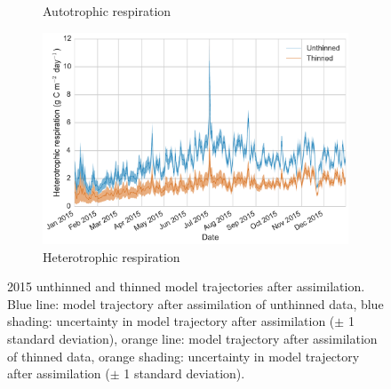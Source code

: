 \documentclass[12pt]{article}
\begin{document}
\begin{figure}[ht]
\begin{subfigure}[b]{0.48\textwidth}
        \caption{Autotrophic respiration}
        \label{fig:ra}
    \end{subfigure}
    \begin{subfigure}[b]{0.48\textwidth}
        \includegraphics[width=\textwidth]{rh.pdf}
        \caption{Heterotrophic respiration}
        \label{fig:rh}
    \end{subfigure}
    \caption{2015 unthinned and thinned model trajectories after assimilation. Blue line: model trajectory after assimilation of unthinned data, blue shading: uncertainty in model trajectory after assimilation (\(\pm\) 1 standard deviation), orange line: model trajectory after assimilation of thinned data, orange shading: uncertainty in model trajectory after assimilation (\(\pm\) 1 standard deviation).} \label{fig:mod}
\end{figure}
\end{document}
